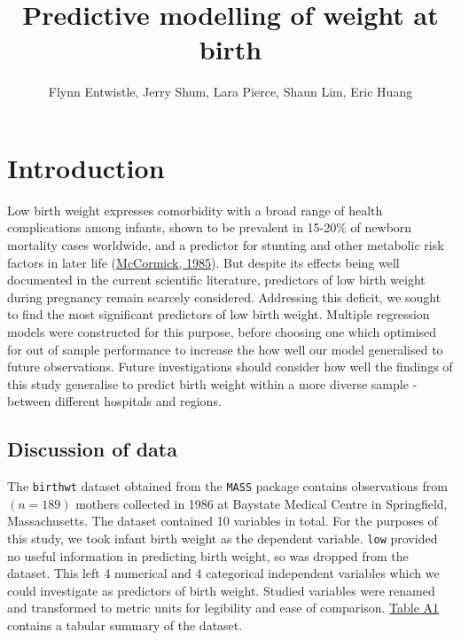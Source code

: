 \documentclass[letterpaper,9pt,twocolumn,twoside,]{pinp}
\title{Predictive modelling of weight at birth}
\author[]{Flynn Entwistle, Jerry Shum, Lara Pierce, Shaun Lim, Eric
Huang}
\begin{document}
\verticaladjustment{-2pt}

\maketitle
\thispagestyle{firststyle}



\pagestyle{fancy}
\fancyfoot{}
\small

\section{Introduction}\label{introduction}

Low birth weight expresses comorbidity with a broad range of health
complications among infants, shown to be prevalent in 15-20\% of newborn
mortality cases worldwide, and a predictor for stunting and other
metabolic risk factors in later life
(\href{https://pubmed.ncbi.nlm.nih.gov/3880598/}{McCormick, 1985}). But
despite its effects being well documented in the current scientific
literature, predictors of low birth weight during pregnancy remain
scarcely considered. Addressing this deficit, we sought to find the most
significant predictors of low birth weight. Multiple regression models
were constructed for this purpose, before choosing one which optimised
for out of sample performance to increase the how well our model
generalised to future observations. Future investigations should
consider how well the findings of this study generalise to predict birth
weight within a more diverse sample - between different hospitals and
regions.

\subsection{Discussion of data}\label{discussion-of-data}

The \texttt{birthwt} dataset obtained from the \texttt{MASS} package
contains observations from \((n=189)\) mothers collected in 1986 at
Baystate Medical Centre in Springfield, Massachusetts. The dataset
contained 10 variables in total. For the purposes of this study, we took
infant birth weight as the dependent variable. \texttt{low} provided no
useful information in predicting birth weight, so was dropped from the
dataset. This left 4 numerical and 4 categorical independent variables
which we could investigate as predictors of birth weight. Studied
variables were renamed and transformed to metric units for legibility
and ease of comparison. \href{tba1}{Table A1} contains a tabular summary
of the dataset.
\end{document}
